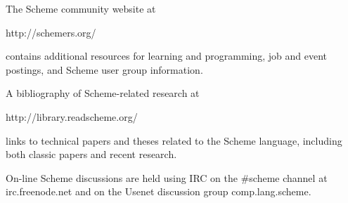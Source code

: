 

The Scheme community website at
\begin{center}
{\cf http://schemers.org/}
\end{center}
contains additional resources for learning and programming, job and
event postings, and Scheme user group information.

A bibliography of Scheme-related research at
\begin{center}
{\cf http://library.readscheme.org/}
\end{center}
links to technical papers and theses related to the Scheme language,
including both classic papers and recent research.

On-line Scheme discussions are held using IRC
on the {\cf \#scheme} channel at {\cf irc.freenode.net}
and on the Usenet discussion group {\cf comp.lang.scheme}.

